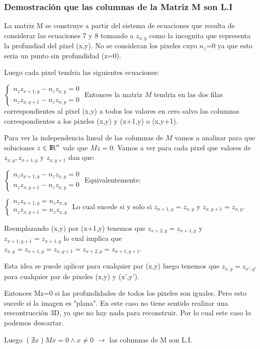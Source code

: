 \subsubsection{Demostración que las columnas de la Matriz M son L.I}
\indent La matriz M se construye a partir del sistema de ecuaciones que resulta de considerar las ecuaciones 7 y 8 tomando a $z_{x,y}$ como la incognita que representa la profundiad del pixel (x,y). No se consideran los pixeles cuyo $n_{z}$=0 ya que esto seria un punto sin profundidad (z=0). \par
\indent Luego cada pixel tendria las siguientes ecuaciones:\par
$\begin{cases}
n_{z} z_{x+1,y} - n_{z} z_{x,y}=0\\
n_{z} z_{x,y+1} - n_{z} z_{x,y}=0
\end{cases}$
\break
\indent Entonces la matriz $M$ tendria en las dos filas correspondientes al pixel (x,y) a todos los valores en cero salvo las columnas correspondientes a los pixeles (x,y) y (x+1,y) o (x,y+1). \par
\indent Para ver la independencia lineal de las columnas de $M$ vamos a analizar para que soluciones $z \in {\rm I\!R}^{n}$ vale que $Mz=0$. Vamos a ver para cada pixel que valores de $z_{x,y} , z_{x+1,y}$  y $z_{x,y+1}$ dan que: \par
$\begin{cases}
n_{z} z_{x+1,y} - n_{z} z_{x,y}=0\\
n_{z} z_{x,y+1} - n_{z} z_{x,y}=0
\end{cases}$
\break
Equivalentemente:\par
$\begin{cases}
n_{z} z_{x+1,y} = n_{z} z_{x,y}\\
n_{z} z_{x,y+1} = n_{z} z_{x,y}
\end{cases}$
\break
\indent Lo cual sucede si y solo si $z_{x+1,y} = z_{x,y}$ y $z_{x,y+1} = z_{x,y}$. \par
Reemplazando (x,y) por (x+1,y) tenemos que $z_{x+2,y} = z_{x+1,y}$ y $z_{x+1,y+1} = z_{x+1,y}$ lo cual implica que $z_{x,y}=z_{x+1,y} =z_{x,y+1}= z_{x+2,y} = z_{x+1,y+1}$.\par
Esta idea se puede aplicar para cualquier par (x,y) luego tenemos que $z_{x,y} = z_{x',y'}$ para cualquier par de pixeles (x,y) y (x',y').\par
\indent Entonces  Mz=0 si las profundidades de todos los pixeles son iguales. Pero esto sucede si la imagen es "plana". En este caso no tiene sentido realizar una rescontrucción 3D, ya que no hay nada para reconstruir. Por lo cual este caso lo podemos descartar.\par
\indent Luego  $(\nexists x ) Mx = 0 \land x \neq 0 $ $\rightarrow$ las columnas de M son L.I.


